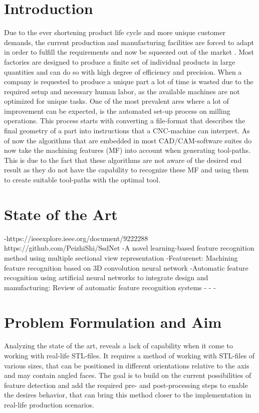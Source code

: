 \documentclass[conference]{IEEEtran}
\begin{document}
\section{Introduction}
Due to the ever shortening product life cycle and more unique customer demands, the current production and manufacturing facilities are forced to adapt in order to fulfill the requirements and now be squeezed out of the market \cite{safi.2017}. Most factories are designed to produce a finite set of individual products in large quantities and can do so with high degree of efficiency and precision. When a company is requested to produce a unique part a lot of time is wasted due to the required setup and necessary human labor, as the available machines are not optimized for unique tasks. \cite{Oliveira.} \newline
One of the most prevalent ares where a lot of improvement can be expected, is the automated set-up process on milling operations. This process starts with converting a file-format that describes the final geometry of a part into instructions that a CNC-machine can interpret. As of now the algorithms that are embedded in most CAD/CAM-software suites do now take the machining features (MF) into account when generating tool-paths. This is due to the fact that these algorithms are not aware of the desired end result as they do not have the capability to recognize these MF and using them to create suitable tool-paths with the optimal tool. \cite{SalehM}
\section{State of the Art}

-https://ieeexplore.ieee.org/document/9222288 https://github.com/PeizhiShi/SsdNet
-A novel learning-based feature recognition method using multiple sectional view representation
-Featurenet: Machining feature recognition based on 3D convolution neural network
-Automatic feature recognition using artificial neural networks to integrate design and manufacturing: Review of automatic feature recognition systems
-
-
-
\section{Problem Formulation and Aim}
Analyzing the state of the art, reveals a lack of capability when it come to working with real-life STL-files. It requires a method of working with STL-files of various sizes, that can be positioned in different orientations relative to the axis and may contain angled faces. The goal is to build on the current possibilities of feature detection and add the required pre- and post-processing steps to enable the desires behavior, that can bring this method closer to the implementation in real-life production scenarios.
\end{document}
